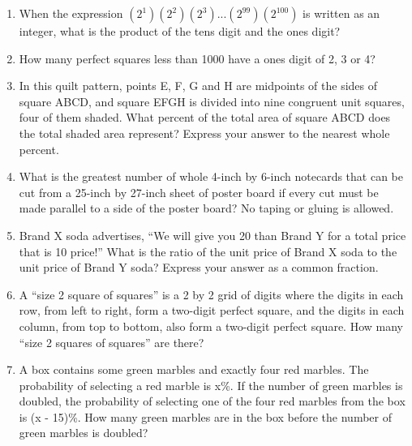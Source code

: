 \documentclass[12pt]{article}
\begin{document}
\begin{enumerate}
\item When the expression $(2^1)(2^2)(2^3)...(2^{99})(2^{100})$ is written as an
integer, what is the product of the tens digit and the ones digit?

\vspace{1cm}

\item How many perfect squares less than 1000 have a ones digit of
2, 3 or 4?

\vspace{1cm}
\item In this quilt pattern, points E, F, G and H are
midpoints of the sides of square ABCD, and
square EFGH is divided into nine congruent
unit squares, four of them shaded.
What percent of the
total area of square ABCD does the total
shaded area represent? Express your answer
to the nearest whole percent.
\vspace{1cm}
\item What is the greatest number of whole 4-inch by 6-inch notecards
that can be cut from a 25-inch by 27-inch sheet of poster board if
every cut must be made parallel to a side of the poster board? No
taping or gluing is allowed.
\vspace{1cm}
\item Brand X soda advertises, “We will give you 20%
than Brand Y for a total price that is 10%
price!” What is the ratio of the unit price of Brand X soda to the
unit price of Brand Y soda? Express your answer as a common
fraction.
\vspace{1cm}
\item A “size 2 square of squares” is a 2 by 2 grid of digits where the
digits in each row, from left to right, form a two-digit perfect
square, and the digits in each column, from top to bottom, also
form a two-digit perfect square. How many “size 2 squares of
squares” are there?
\vspace{1cm}
\item A box contains some green marbles and exactly four red marbles.
The probability of selecting a red marble is x\%. If the number of
green marbles is doubled, the probability of selecting one of the
four red marbles from the box is (x - 15)\%. How many green
marbles are in the box before the number of green marbles is
doubled?
\vspace{1cm}


\end{enumerate}
\end{document}

